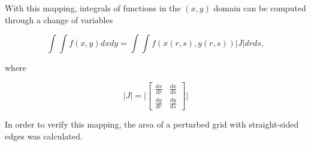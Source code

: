 \documentclass{article}
\begin{document}
\noindent With this mapping, integrals of functions in the $(x,y)$ domain can be computed through a change of variables

\begin{equation}
\int \int f(x,y) dx dy = \int \int f(x(r,s), y(r,s)) |J| dr ds,
\end{equation} 

\noindent where

\begin{equation*}
|J| =    \lvert \begin{bmatrix}
      \frac{dx}{dr} & \frac{dx}{ds}\\
      \frac{dy}{dr} & \frac{dy}{ds}
    \end{bmatrix} \rvert
\end{equation*}

In order to verify this mapping, the area of a perturbed grid with straight-sided edges was calculated. 
\end{document}
